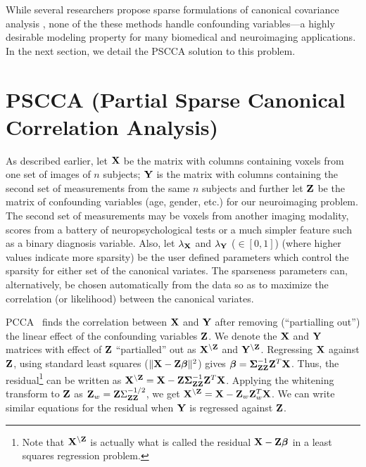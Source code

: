 \documentclass{llncs}
\newcommand{\X}{{\bf X}}
\newcommand{\Y}{{\bf Y}}
\newcommand{\Z}{{\bf Z}}
\newcommand{\bs}{\boldsymbol}
\begin{document}
While several researchers propose sparse formulations of canonical
covariance analysis \cite{parkhomenko,witten,lykou}, none of the these
methods handle confounding variables---a highly desirable modeling
property for many biomedical and neuroimaging applications.  In the
next section, we detail the PSCCA solution to this problem.

\section{PSCCA (Partial Sparse Canonical Correlation Analysis)}
As described earlier, let $\X$ be the matrix with columns containing voxels from one set of
images of $n$ subjects; $\Y$ is the matrix with columns containing
the second set of measurements from the same $n$ subjects and further
let $\Z$ be the matrix of confounding variables (age, gender, etc.) for
our neuroimaging problem.  The second set of measurements may be
voxels from another imaging modality, scores from a battery of
neuropsychological tests or a much simpler feature such as a binary
diagnosis variable.  Also, let $\lambda_{\X}$ and $\lambda_{\Y}$ ($\in
[0,1]$) (where higher values indicate more sparsity) be the user defined 
parameters which control the sparsity for either set of the canonical
variates.  The sparseness parameters can, alternatively, be chosen automatically 
from the data so as to maximize the correlation (or likelihood) between the canonical variates.

PCCA~\cite{timm} finds the correlation between $\X$ and $\Y$ after removing (``partialling out'') the linear effect of the confounding variables $\Z$. 
We denote the $\X$ and $\Y$ matrices with effect of $\Z$ ``partialled'' out as $\X^{\backslash\Z}$ and $\Y^{\backslash\Z}$. Regressing $\X$ against $\Z$, using standard least squares ($\|\X -\Z\bs\beta\|^2$) gives $\bs\beta=  \bs\Sigma_{\Z\Z}^{-1}\Z^T\X$. 
Thus, the residual\footnote{Note that $\X^{\backslash\Z}$ is actually what is called the residual $\X-\Z\bs\beta$ in a least squares regression problem.} can be written as  $\X^{\backslash\Z}=\X - \Z\bs\Sigma_{\Z\Z}^{-1}\Z^T\X$. Applying the whitening transform to $\Z$  as $\Z_w =\Z \Sigma_{\Z\Z}^{-1/2}$, we get $\X^{\backslash\Z}=\X - \Z_w\Z_w^T\X$.
We can write similar equations for the residual when $\Y$ is regressed against $\Z$.
 
\end{document}
